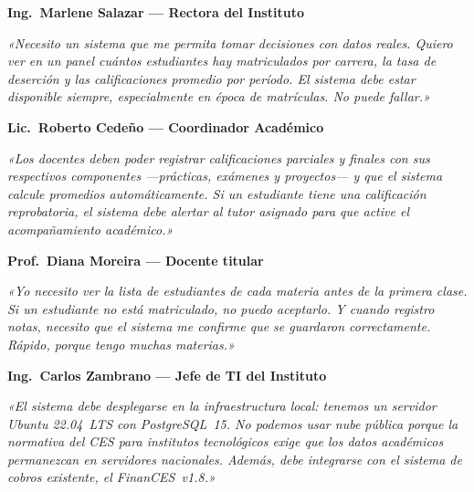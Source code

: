 \documentclass[11pt,a4paper]{article}
\begin{document}
	\vspace{8pt}
	
	\noindent\colorbox{uteqgreen!15}{\parbox{\dimexpr\linewidth-2\fboxsep}{%
			\textbf{\color{uteqgreen}Ing.\ Marlene Salazar --- Rectora del Instituto}}}
	
	\noindent\textit{«Necesito un sistema que me permita tomar decisiones con datos
		reales. Quiero ver en un panel cuántos estudiantes hay matriculados por
		carrera, la tasa de deserción y las calificaciones promedio por período.
		El sistema debe estar disponible siempre, especialmente en época de
		matrículas. No puede fallar.»}
	
	\vspace{6pt}
	\noindent\colorbox{uteqgreen!15}{\parbox{\dimexpr\linewidth-2\fboxsep}{%
			\textbf{\color{uteqgreen}Lic.\ Roberto Cedeño --- Coordinador Académico}}}
	
	\noindent\textit{«Los docentes deben poder registrar calificaciones parciales
		y finales con sus respectivos componentes ---prácticas, exámenes y
		proyectos--- y que el sistema calcule promedios automáticamente. Si un
		estudiante tiene una calificación reprobatoria, el sistema debe alertar
		al tutor asignado para que active el acompañamiento académico.»}
	
	\vspace{6pt}
	\noindent\colorbox{uteqgreen!15}{\parbox{\dimexpr\linewidth-2\fboxsep}{%
			\textbf{\color{uteqgreen}Prof.\ Diana Moreira --- Docente titular}}}
	
	\noindent\textit{«Yo necesito ver la lista de estudiantes de cada materia
		antes de la primera clase. Si un estudiante no está matriculado, no puedo
		aceptarlo. Y cuando registro notas, necesito que el sistema me confirme
		que se guardaron correctamente. Rápido, porque tengo muchas materias.»}
	
	\vspace{6pt}
	\noindent\colorbox{uteqgreen!15}{\parbox{\dimexpr\linewidth-2\fboxsep}{%
			\textbf{\color{uteqgreen}Ing.\ Carlos Zambrano --- Jefe de TI del Instituto}}}
	
	\noindent\textit{«El sistema debe desplegarse en la infraestructura local:
		tenemos un servidor Ubuntu 22.04~LTS con PostgreSQL~15. No podemos usar
		nube pública porque la normativa del CES para institutos tecnológicos
		exige que los datos académicos permanezcan en servidores nacionales.
		Además, debe integrarse con el sistema de cobros existente, el
		FinanCES~v1.8.»}
	
\end{document}
